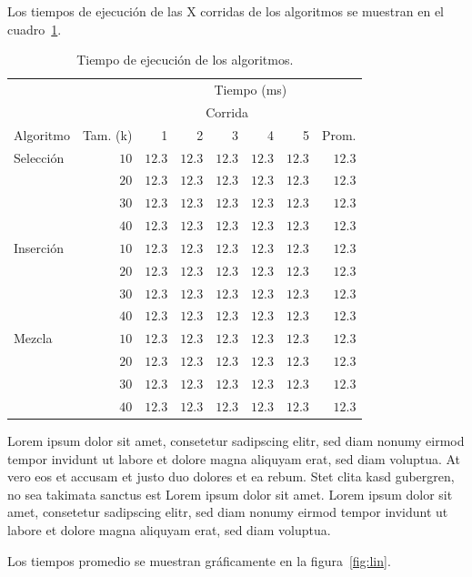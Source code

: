 \documentclass[twocolumn,english,spanish,journal]{IEEEtran}
\providecommand{\tabularnewline}{\\}
\begin{document}
Los tiempos de ejecución de las X corridas de los algoritmos se muestran
en el cuadro~\ref{tab:tiempos}.
\begin{table}
\caption{Tiempo de ejecución de los algoritmos.\label{tab:tiempos}}


\centering{}%
\begin{tabular}{lrrrrrrr}
\toprule 
 &  & \multicolumn{6}{c}{Tiempo (ms)}\tabularnewline
\cmidrule{3-8} 
 &  & \multicolumn{5}{c}{Corrida} & \tabularnewline
\cmidrule{3-7} 
Algoritmo & Tam. (k) & 1 & 2 & 3 & 4 & 5 & Prom.\tabularnewline
\midrule 
Selección & $10$ & $12.3$ & $12.3$ & $12.3$ & $12.3$ & $12.3$ & $12.3$\tabularnewline
 & $20$ & $12.3$ & $12.3$ & $12.3$ & $12.3$ & $12.3$ & $12.3$\tabularnewline
 & $30$ & $12.3$ & $12.3$ & $12.3$ & $12.3$ & $12.3$ & $12.3$\tabularnewline
 & $40$ & $12.3$ & $12.3$ & $12.3$ & $12.3$ & $12.3$ & $12.3$\tabularnewline
\midrule
Inserción & $10$ & $12.3$ & $12.3$ & $12.3$ & $12.3$ & $12.3$ & $12.3$\tabularnewline
 & $20$ & $12.3$ & $12.3$ & $12.3$ & $12.3$ & $12.3$ & $12.3$\tabularnewline
 & $30$ & $12.3$ & $12.3$ & $12.3$ & $12.3$ & $12.3$ & $12.3$\tabularnewline
 & $40$ & $12.3$ & $12.3$ & $12.3$ & $12.3$ & $12.3$ & $12.3$\tabularnewline
\midrule
Mezcla & $10$ & $12.3$ & $12.3$ & $12.3$ & $12.3$ & $12.3$ & $12.3$\tabularnewline
 & $20$ & $12.3$ & $12.3$ & $12.3$ & $12.3$ & $12.3$ & $12.3$\tabularnewline
 & $30$ & $12.3$ & $12.3$ & $12.3$ & $12.3$ & $12.3$ & $12.3$\tabularnewline
 & $40$ & $12.3$ & $12.3$ & $12.3$ & $12.3$ & $12.3$ & $12.3$\tabularnewline
\bottomrule
\end{tabular}
\end{table}

 Lorem ipsum dolor sit amet, consetetur sadipscing elitr, sed diam
nonumy eirmod tempor invidunt ut labore et dolore magna aliquyam erat,
sed diam voluptua. At vero eos et accusam et justo duo dolores et
ea rebum. Stet clita kasd gubergren, no sea takimata sanctus est Lorem
ipsum dolor sit amet. Lorem ipsum dolor sit amet, consetetur sadipscing
elitr, sed diam nonumy eirmod tempor invidunt ut labore et dolore
magna aliquyam erat, sed diam voluptua.

Los tiempos promedio se muestran gráficamente en la figura~\ref{fig:lin}.
\end{document}
